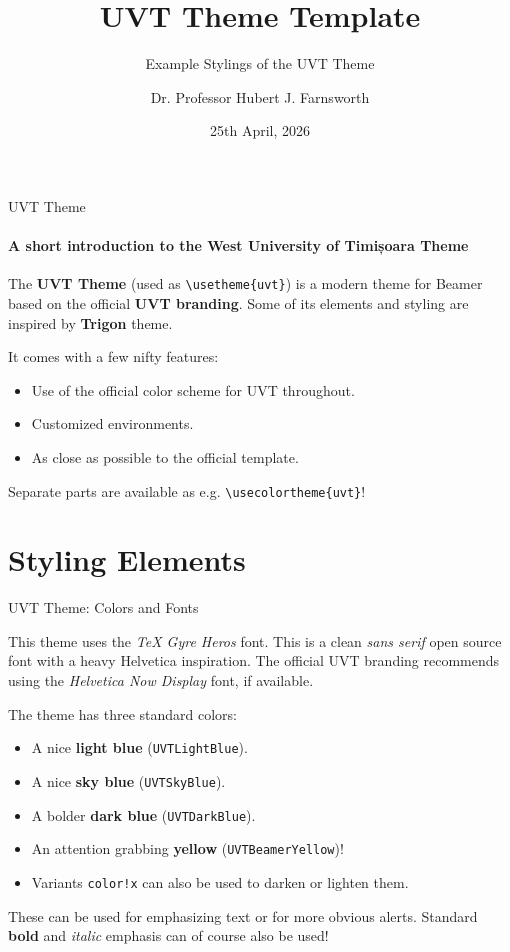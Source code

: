 \documentclass[aspectratio=169, t]{beamer}
\title{UVT Theme Template}
\subtitle{Example Stylings of the UVT Theme}
\author[H. J. F.]{Dr. Professor Hubert J. Farnsworth}
\institute{West University of Timișoara}
\date{25th April, 2026}
\begin{document}
\titleframe

\begin{frame}{UVT Theme}
\framesubtitle{A short introduction to the West University of Timișoara Theme}

The \textbf{UVT Theme} (used as \texttt{\textbackslash usetheme\{uvt\}}) is a
modern theme for Beamer based on the official
\textcolor{UVTBeamerYellow}{\textbf{UVT branding}}\footnotemark[1]. Some
of its elements and styling are inspired by \textcolor{UVTBeamerYellow}{\textbf{Trigon}}
theme\footnotemark[2].

\bigskip
It comes with a few nifty features:
\begin{itemize}
    \item Use of the official color scheme for UVT throughout.
    \item Customized environments.
    \item As close as possible to the official template.
\end{itemize}

\bigskip
Separate parts are available as e.g. \texttt{\textbackslash usecolortheme\{uvt\}}!

\end{frame}

\section{Styling Elements}

\begin{frame}{UVT Theme: Colors and Fonts}

This theme uses the \emph{TeX Gyre Heros} font. This is a clean \emph{sans serif}
open source font with a heavy Helvetica inspiration. The official UVT branding recommends
using the \emph{Helvetica Now Display} font, if available.

\bigskip
The theme has three standard colors:
\begin{itemize}
    \item A nice \textcolor{UVTLightBlue}{\textbf{light blue}} (\texttt{UVTLightBlue}).
    \item A nice \textcolor{UVTSkyBlue}{\textbf{sky blue}} (\texttt{UVTSkyBlue}).
    \item A bolder \textcolor{UVTDarkBlue}{\textbf{dark blue}} (\texttt{UVTDarkBlue}).
    \item An attention grabbing \textcolor{UVTBeamerYellow}{\textbf{yellow}}
        (\texttt{UVTBeamerYellow})!
    \item Variants \texttt{color!x} can also be used to darken or lighten them.
\end{itemize}

\bigskip
These can be used for emphasizing \textcolor{UVTDarkBlue}{text} or for
more obvious \alert{alerts}. Standard \textbf{bold} and \textit{italic} emphasis
can of course also be used!
\end{frame}
\end{document}

